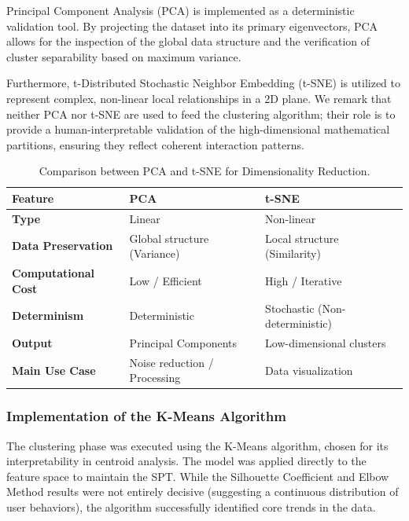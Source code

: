 Principal Component Analysis (PCA) is implemented as a deterministic validation tool. By projecting the dataset into its primary eigenvectors, PCA allows for the inspection of the global data structure and the verification of cluster separability based on maximum variance.

Furthermore, t-Distributed Stochastic Neighbor Embedding (t-SNE) is utilized to represent complex, non-linear local relationships in a 2D plane. %
We remark that neither PCA nor t-SNE are used to feed the clustering algorithm; their role is to provide a human-interpretable validation of the high-dimensional mathematical partitions, ensuring they reflect coherent interaction patterns.



\begin{table}[htbp]
\centering
\caption{Comparison between PCA and t-SNE for Dimensionality Reduction.}
\label{tab:pca_vs_tsne}
\begin{tabular}{@{}lll@{}}
\toprule
\textbf{Feature}          & \textbf{PCA}                  & \textbf{t-SNE}                 \\ \midrule
\textbf{Type}             & Linear                        & Non-linear                     \\
\textbf{Data Preservation}& Global structure (Variance)   & Local structure (Similarity)   \\
\textbf{Computational Cost}& Low / Efficient               & High / Iterative               \\
\textbf{Determinism}      & Deterministic                 & Stochastic (Non-deterministic) \\
\textbf{Output}           & Principal Components          & Low-dimensional clusters       \\
\textbf{Main Use Case}    & Noise reduction / Processing  & Data visualization             \\ \bottomrule
\end{tabular}
\end{table}












       \subsubsection{Implementation of the K-Means Algorithm}
The clustering phase was executed using the K-Means algorithm, chosen for its interpretability in centroid analysis. The model was applied directly to the feature space to maintain the SPT. While the Silhouette Coefficient and Elbow Method results were not entirely decisive (suggesting a continuous distribution of user behaviors), the algorithm successfully identified core trends in the data.

